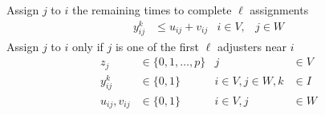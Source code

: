 Assign $j$ to $i$
the remaining times to complete $\ell$ assignments
\begin{align}
  y_{ij}^{k}
  & \leq u_{ij}
  + v_{ij}
  & i \in V,
  & j \in W
\end{align}
Assign $j$ to $i$
only if
$j$ is one of the first $\ell$ adjusters near $i$
\begin{align}
  z_j
  & \in \{0,1,\ldots,p\}
  & j
  & \in V \nonumber
  \\
  y_{ij}^{k} 
  & \in \{0,1\}
  & i\in V,j\in W,k
  & \in I \nonumber
  \\
  u_{ij},v_{ij}
  & \in \{0,1\}
  & i \in V,j
  & \in W \nonumber
\end{align}
